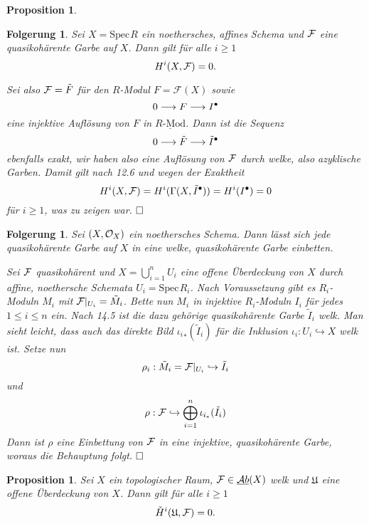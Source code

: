 \documentclass[11pt]{book}
\newtheorem{proposition}[theorem]{Proposition}
\newtheorem{folg}[theorem]{Folgerung}
\theoremstyle{nonumberbreak}
\newenvironment{pr}[1][]{\ifthenelse{\equal{#1}{}}{\proof}{\proof[#1]}\rm}{\endproof}
\newcommand{\spec}{\mathrm{Spec} \hspace{1pt} }
\newcommand{\Rmod}{\underline{R\textrm{-}\mathrm{Mod}}}
\newcommand{\AbX}{\underline{\mathcal{A}b}(X)}
\begin{document}
\begin{spacing}{1.4}
\begin{proposition}
\end{proposition}


\begin{folg}  %
Sei $X= \spec R$ ein noethersches, affines Schema und $\mathcal{F}$ eine quasikohärente Garbe auf $X$. Dann gilt für alle $i \geqslant 1$ 
$$H^{i}(X, \mathcal{F}) = 0.$$

\begin{pr}
Sei also $\mathcal{F}= \tilde{F}$ für den $R$-Modul $F= \mathcal{F}(X)$ sowie 
$$0 \longrightarrow F \longrightarrow I^{\bullet}$$
eine injektive Auflösung von $F$ in $\Rmod$. Dann ist die Sequenz
$$0 \longrightarrow \tilde{F} \longrightarrow \tilde{I}^{\bullet}$$
ebenfalls exakt, wir haben also eine Auflösung von $\mathcal{F}$ durch welke, also azyklische Garben. Damit gilt nach 12.6 und wegen der Exaktheit
$$H^{i}(X, \mathcal{F}) = H^{i}(\Gamma(X, \tilde{I}^{\bullet})) =H^{i}(I^{\bullet})= 0$$
für $i \geqslant 1$, was zu zeigen war. $\hfill \Box$

\end{pr}
\end{folg}


\begin{folg} %


Sei $(X, \mathcal{O}_X)$ ein noethersches Schema. Dann lässt sich jede quasikohärente Garbe auf $X$ in eine welke, quasikohärente Garbe einbetten.
\begin{pr}


Sei $\mathcal{F}$ quasikohärent und $X= \bigcup_{i=1}^n U_i$ eine offene Überdeckung von $X$ durch affine, noethersche Schemata $U_i = \spec R_i$. Nach Voraussetzung gibt es $R_i$-Moduln $M_i$ mit $\mathcal{F} \vert_{U_i} = \tilde{M}_i$. Bette nun $M_i$ in injektive $R_i$-Moduln $I_i$ für jedes $1 \leqslant i \leqslant n$ ein. Nach 14.5 ist die dazu gehörige quasikohärente Garbe $\tilde{I}_i$ welk. Man sieht leicht, dass auch das direkte Bild ${{\iota_i}_*}(\tilde{I}_i)$ für die Inklusion $\iota_i: U_i \hookrightarrow X$ welk ist. Setze nun
$$\rho_i : \tilde{M}_i = \mathcal{F} \vert_{U_i} \hookrightarrow \tilde{I}_i$$
und 
$$\rho: \mathcal{F} \hookrightarrow \bigoplus_{i=1}^n \iota_{i_{*}}(\tilde{I}_i)$$
Dann ist $\rho$ eine Einbettung von $\mathcal{F}$ in eine injektive, quasikohärente Garbe, woraus die Behauptung folgt. $\hfill \Box$
\end{pr}
\end{folg}


\begin{proposition}    %
Sei $X$ ein topologischer Raum, $\F \in \AbX$ welk und $\mathfrak{U}$ eine offene Überdeckung von $X$. Dann gilt für alle $i \geqslant 1$
$$\check{H}^{i}(\mathfrak{U}, \mathcal{F}) = 0.$$


\end{proposition}
\end{spacing}
\end{document}

